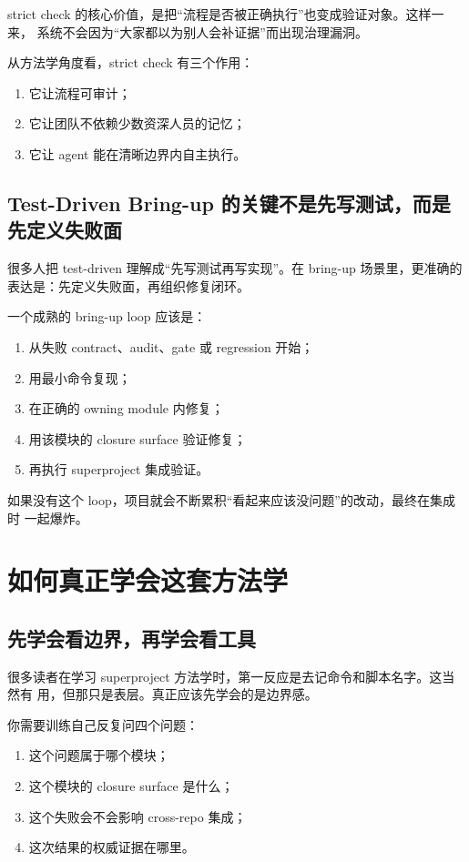 \documentclass[UTF8,11pt,a4paper,oneside]{ctexbook}
\begin{document}
strict check 的核心价值，是把“流程是否被正确执行”也变成验证对象。这样一来，
系统不会因为“大家都以为别人会补证据”而出现治理漏洞。

从方法学角度看，strict check 有三个作用：

\begin{enumerate}
  \item 它让流程可审计；
  \item 它让团队不依赖少数资深人员的记忆；
  \item 它让 agent 能在清晰边界内自主执行。
\end{enumerate}

\section{Test-Driven Bring-up 的关键不是先写测试，而是先定义失败面}

很多人把 test-driven 理解成“先写测试再写实现”。在 bring-up 场景里，更准确的
表达是：先定义失败面，再组织修复闭环。

一个成熟的 bring-up loop 应该是：

\begin{enumerate}
  \item 从失败 contract、audit、gate 或 regression 开始；
  \item 用最小命令复现；
  \item 在正确的 owning module 内修复；
  \item 用该模块的 closure surface 验证修复；
  \item 再执行 superproject 集成验证。
\end{enumerate}

如果没有这个 loop，项目就会不断累积“看起来应该没问题”的改动，最终在集成时
一起爆炸。

\chapter{如何真正学会这套方法学}

\section{先学会看边界，再学会看工具}

很多读者在学习 superproject 方法学时，第一反应是去记命令和脚本名字。这当然有
用，但那只是表层。真正应该先学会的是边界感。

你需要训练自己反复问四个问题：

\begin{enumerate}
  \item 这个问题属于哪个模块；
  \item 这个模块的 closure surface 是什么；
  \item 这个失败会不会影响 cross-repo 集成；
  \item 这次结果的权威证据在哪里。
\end{enumerate}
\end{document}
